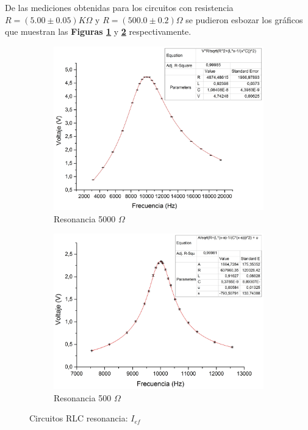 \documentclass[11pt,a4paper]{article}
\begin{document}
De las mediciones obtenidas para los circuitos con resistencia $R=(5.00 \pm 0.05)K\Omega$ y $R=(500.0 \pm 0.2)\Omega$ se pudieron esbozar los gráficos que muestran las \textbf{Figuras \ref{subfig:RES_I.a}} y \textbf{\ref{subfig:RES_I.b}} respectivamente.

\begin{figure}[h!]

\begin{subfigure}{0.5\textwidth}
\includegraphics[scale=0.3]{RLC_RES_5000_VvsF}
  \caption{Resonancia 5000 $\Omega$}
  \label{subfig:RES_I.a}
\end{subfigure}
\begin{subfigure}{0.5\textwidth}
\includegraphics[scale=0.32]{RLC_RES_500_VvsF}
  \caption{Resonancia 500 $\Omega$}
  \label{subfig:RES_I.b}
\end{subfigure}
  \caption{Circuitos RLC resonancia: $I_{ef}$}
  \label{fig:RES_I}
\end{figure}
\end{document}
